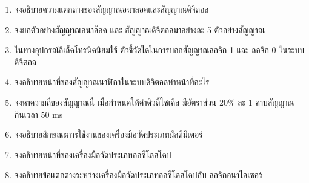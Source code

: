 \newpage
\QAChapter
\begin{enumerate}
	\item จงอธิบายความแตกต่างของสัญญาณอนาลอคและสัญญาณดิจิตอล 
	\item จงยกตัวอย่างสัญญาณอนาล๊อค และ สัญญาณดิจิตอลมาอย่างละ 5 ตัวอย่างสัญญาณ
	\item ในทางอุปกรณ์อิเล็คโทรนิคนิยมใช้ ตัวชี้วัดใดในการบอกสัญญาณลอจิก 1 และ ลอจิก 0 ในระบบดิจิตอล
	\item จงอธิบายหน้าที่ของสัญญาณนาฬิกาในระบบดิจิตอลทำหน้าที่อะไร
	\item จงหาความถี่ของสัญญาณนี้ เมื่อกำหนดให้ค่าดิวตี้ไซเคิล มีอัตราส่วน 20\% ละ 1 คาบสัญญาณ กินเวลา 50 ms 
	\item จงอธิบายลักษณะการใช้งานของเครื่องมือวัดประเภทมัลติมิเตอร์
	\item จงอธิบายหน้าที่ของเครื่องมือวัดประเภทออซิโลสโคป
	\item จงอธิบายข้อแตกต่างระหว่างเครื่องมือวัดประเภทออซิโลสโคปกับ ลอจิกอนาไลเซอร์
\end{enumerate}

